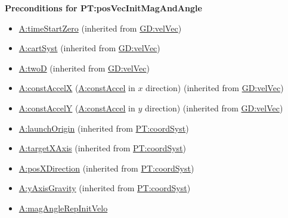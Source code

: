 \documentclass[12pt]{article}
\begin{document}
\noindent \textbf{Preconditions for PT:posVecInitMagAndAngle}
\begin{itemize}
\item \hyperref[timeStartZero]{A:timeStartZero} (inherited from \hyperref[GD:velVec]{GD:velVec})
\item \hyperref[cartSyst]{A:cartSyst} (inherited from \hyperref[GD:velVec]{GD:velVec})
\item \hyperref[twoD]{A:twoD} (inherited from \hyperref[GD:velVec]{GD:velVec})
\item \hyperref[constAccelX]{A:constAccelX} (\hyperref[constAccel]{A:constAccel}
in $x$ direction) (inherited from \hyperref[GD:velVec]{GD:velVec})
\item \hyperref[constAccelY]{A:constAccelY} (\hyperref[constAccel]{A:constAccel}
in $y$ direction) (inherited from \hyperref[GD:velVec]{GD:velVec})
\item \hyperref[launchOrigin]{A:launchOrigin} (inherited from \hyperref[PT:coordSyst]{PT:coordSyst})
\item \hyperref[targetXAxis]{A:targetXAxis} (inherited from \hyperref[PT:coordSyst]{PT:coordSyst})
\item \hyperref[posXDirection]{A:posXDirection} (inherited from \hyperref[PT:coordSyst]{PT:coordSyst})
\item \hyperref[yAxisGravity]{A:yAxisGravity} (inherited from \hyperref[PT:coordSyst]{PT:coordSyst})
\item \hyperref[magAngleRepInitVelo]{A:magAngleRepInitVelo}
\end{itemize}
\end{document}
